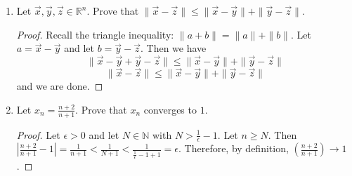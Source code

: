 \documentclass[12pt]{article}
\newcommand{\R}{\mathbb{R}}
\newcommand{\N}{\mathbb{N}}
\begin{document}
\begin{enumerate}
\begin{enumerate}
\begin{proof}
Case 2: $x < 0$. We use the additive inverse and the fact above. So, 
$$-x > 0$$ 
$$-x \cdot -x > 0 \cdot -x$$ 
$$x^2 > 0$$ 
and we are done. 
\end{proof}
\item For all $w, x, y, z\in X$, if $w\leq x$ and $y\leq z$, then $w+y\leq x+z$.
\begin{proof}
If $w\leq x$ and $y\leq z$, then we have $z-y \geq 0$ and $x-w \geq 0$. Rearranging, we get $w-x \leq 0$ and $z - y \geq 0$. Thus, it follows that 
$$z-y \geq w-x$$
$$z \geq w - x + y$$
$$z + x \geq w+y$$
Thus, $w+y\leq x+z$.
and we are done. 
\end{proof}
\item For all $x, y, z\in X$, if $x\geq 0$ and $y\leq z$, then $xy\leq xz$.
\begin{proof}
Since $x \geq 0$ and $y \leq z$ then $y-z \leq 0$. So, 
$$x \cdot (y-z) \leq 0 $$
$$xy - xz \leq 0 $$
$$xy \leq xz $$
and we are done. 
\end{proof}
\item For all $x, y, z\in X$, if $x\leq 0$ and $y\leq z$, then $xy\geq xz$.
\begin{proof}
Since $x\leq 0$ and $y\leq z$, then $y-z \leq 0$. Then since $x\leq 0$, we have two negative numbers and thus
$$x \cdot (y-z) \geq 0 \cdot x$$
$$xy- xz \geq 0$$
$$xy \geq xz$$
 and we are done. 
\end{proof}
\end{enumerate}

\item Let $\vec{x}, \vec{y}, \vec{z}\in \R^n$. Prove that $\|\vec{x}-\vec{z}\|\leq \|\vec{x}-\vec{y}\|+\|\vec{y}-\vec{z}\|$.

\begin{proof}
Recall the triangle inequality: $\|a + b\| = \|a\| + \|b\|$. Let $a = \vec{x} - \vec{y}$ and let $b= \vec{y} - \vec{z}$. Then we have $$\|\vec{x}-\vec{y} + \vec{y} - \vec{z}\|\leq \|\vec{x}-\vec{y}\|+\|\vec{y}-\vec{z}\|$$ $$\|\vec{x}-\vec{z}\|\leq \|\vec{x}-\vec{y}\|+\|\vec{y}-\vec{z}\|$$ and we are done.  

\end{proof}

\item Let $x_n = \frac{n+2}{n+1}$. Prove that $x_n$ converges to $1$.

\begin{proof}
Let $\epsilon > 0$ and let $N \in \N$ with $N > \frac{1}{\epsilon} - 1$. Let $n \geq N$. Then $|\frac{n+2}{n+1} - 1| = \frac{1}{n+1} < \frac{1}{N + 1} < \frac{1}{\frac{1}{\epsilon} - 1 + 1} = \epsilon$. Therefore, by definition, $(\frac{n+2}{n+1}) \to 1$.
\end{proof}


\end{enumerate}
\end{document}
